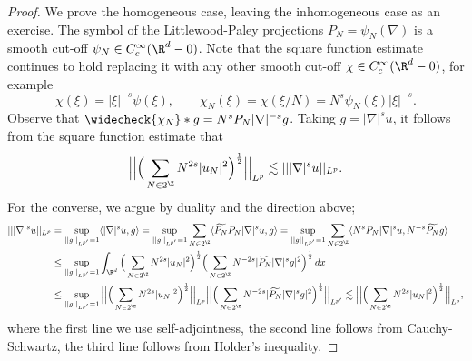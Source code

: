 \begin{proof}	 	
	We prove the homogeneous case, leaving the inhomogeneous case as an exercise. The symbol of the Littlewood-Paley projections $P_N = \psi_N (\nabla)$ is a smooth cut-off $\psi_N \in C^\infty_c (\R^d - 0)$. Note that the square function estimate continues to hold replacing it with any other smooth cut-off $\chi \in C^\infty_c (\R^d - 0)$, for example
		\[ \chi (\xi) = |\xi|^{-s} \psi(\xi), \qquad \chi_N (\xi) = \chi(\xi/N) = N^s \psi_N (\xi) |\xi|^{-s}. \]
	Observe that $\widecheck{\chi_N} * g = N^s P_N |\nabla|^{-s} g$. Taking $g = |\nabla|^s u$, it follows from the square function estimate that
		\[ \Big|\Big| \Big( \sum_{N \in 2^\Z} N^{2s} |u_N|^2 \Big)^\frac12 \Big|\Big|_{L^p} \lesssim |||\nabla|^s u||_{L^p}. \]	
	For the converse, we argue by duality and the direction above;
	\begin{align*}
		|||\nabla|^s u||_{L^p}
			&= \sup_{||g||_{L^{p'}} = 1} \langle |\nabla|^s u, g \rangle = \sup_{||g||_{L^{p'}} = 1} \sum_{N \in 2^\Z} \langle \widetilde{P_N} P_N |\nabla|^s u, g \rangle = \sup_{||g||_{L^{p'}} = 1} \sum_{N \in 2^\Z} \langle N^s P_N |\nabla|^s u,  N^{-s} \widetilde{P_N} g \rangle \\
			&\leq  \sup_{||g||_{L^{p'}} = 1} \int_{\R^d} \Big( \sum_{N \in 2^\Z} N^{2s} |u_N|^2 \Big)^{\frac12} \Big( \sum_{N \in 2^\Z} N^{-2s} |\widetilde{P_N} |\nabla|^s g|^2 \Big)^{\frac12} \, dx \\
			&\leq  \sup_{||g||_{L^{p'}} = 1} \Big| \Big| \Big( \sum_{N \in 2^\Z} N^{2s} |u_N|^2 \Big)^{\frac12}\Big|\Big|_{L^p} \Big| \Big|  \Big( \sum_{N \in 2^\Z} N^{-2s} |\widetilde{P_N} |\nabla|^s g|^2 \Big)^{\frac12} \Big|\Big|_{L^{p'}} \lesssim  \Big| \Big| \Big( \sum_{N \in 2^\Z} N^{2s} |u_N|^2 \Big)^{\frac12}\Big|\Big|_{L^p},
	\end{align*}
	where the first line we use self-adjointness, the second line follows from Cauchy-Schwartz, the third line follows from Holder's inequality. 
\end{proof}	